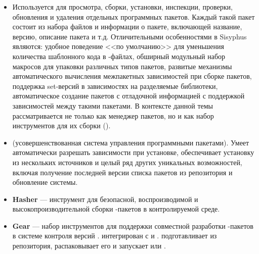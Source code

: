 \begin{itemize}
	\item {} Используется для просмотра, сборки, установки, инспекции, проверки, обновления и удаления отдельных программных пакетов. Каждый такой пакет состоит из набора файлов и информации о пакете, включающей название, версию, описание пакета и т.д. Отличительными особенностями  в Sisyphus являются: удобное поведение <<по умолчанию>> для уменьшения количества шаблонного кода в -файлах, обширный модульный набор макросов для упаковки различных типов пакетов, развитые механизмы автоматического вычисления межпакетных зависимостей при сборке пакетов, поддержка set-версий в зависимостях на разделяемые библиотеки, автоматическое создание пакетов с отладочной информацией с поддержкой зависимостей между такими пакетами. В контексте данной темы  рассматривается не только как менеджер пакетов, но и как набор инструментов для их сборки (). 
	
	\item {} (усовершенствованная система управления программными пакетами). Умеет автоматически разрешать зависимости при установке, обеспечивает установку из нескольких источников и целый ряд других уникальных возможностей, включая получение последней версии списка пакетов из репозитория и обновление системы.
	
	\item \textbf{Hasher} --- инструмент для безопасной, воспроизводимой и высокопроизводительной сборки -пакетов в контролируемой среде.
	
	\item \textbf{Gear} --- набор инструментов для поддержки совместной разработки -пакетов в системе контроля версий .  интегрирован с  и .  подготавливает  из  репозитория, распаковывает его и запускает  или .
\end{itemize}